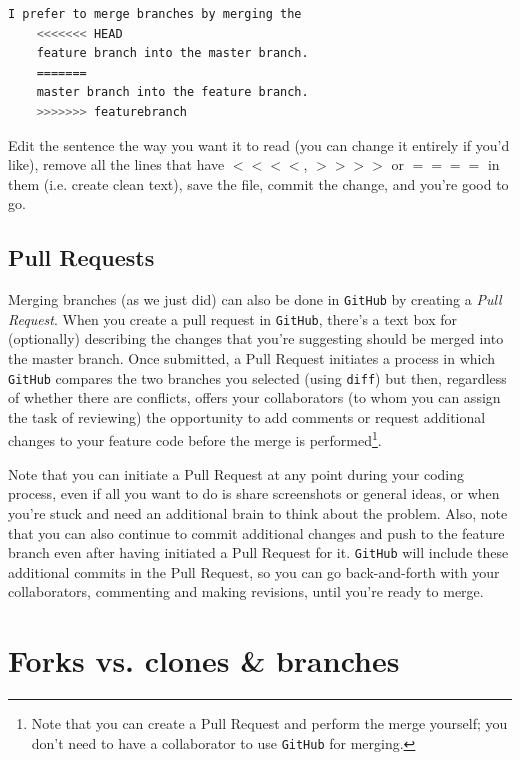 \documentclass[12pt,letterpaper]{article}
\begin{document}
\begin{lstlisting}[language=bash]
	I prefer to merge branches by merging the
	<<<<<<< HEAD
	feature branch into the master branch.
	=======
	master branch into the feature branch.
	>>>>>>> featurebranch
\end{lstlisting}

\noindent
Edit the sentence the way you want it to read (you can change it entirely if you'd like), remove all the lines that have $<<<<$, $>>>>$ or $====$ in them (i.e. create clean text), save the file, commit the change, and you're good to go.


\subsection{Pull Requests}

Merging branches (as we just did) can also be done in \texttt{GitHub} by creating a \emph{Pull Request}.
When you create a pull request in \texttt{GitHub}, there's a text box for (optionally) describing the changes that you're suggesting should be merged into the master branch.
Once submitted, a Pull Request initiates a process in which \texttt{GitHub} compares the two branches you selected (using \texttt{diff}) but then, regardless of whether there are conflicts, offers your collaborators (to whom you can assign the task of reviewing) the opportunity to add comments or request additional changes to your feature code before the merge is performed\footnote{Note that you can create a Pull Request and perform the merge yourself; you don't need to have a collaborator to use \texttt{GitHub} for merging.}.

Note that you can initiate a Pull Request at any point during your coding process, even if all you want to do is share screenshots or general ideas, or when you're stuck and need an additional brain to think about the problem.
Also, note that you can also continue to commit additional changes and push to the feature branch even after having initiated a Pull Request for it.
\texttt{GitHub} will include these additional commits in the Pull Request, 
so you can go back-and-forth with your collaborators, commenting and making 
revisions, until you're ready to merge.



\section{Forks vs. clones \& branches}
\end{document}
